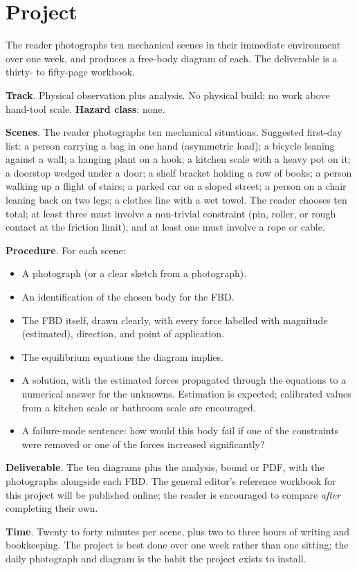 \section{Project}

\begin{project}
The reader photographs ten mechanical scenes in their immediate
environment over one week, and produces a free-body diagram of each.
The deliverable is a thirty- to fifty-page workbook.

\textbf{Track}. Physical observation plus analysis. No physical
build; no work above hand-tool scale. \textbf{Hazard class}: none.

\textbf{Scenes}. The reader photographs ten mechanical situations.
Suggested first-day list: a person carrying a bag in one hand
(asymmetric load); a bicycle leaning against a wall; a hanging
plant on a hook; a kitchen scale with a heavy pot on it; a doorstop
wedged under a door; a shelf bracket holding a row of books; a
person walking up a flight of stairs; a parked car on a sloped
street; a person on a chair leaning back on two legs; a clothes line
with a wet towel. The reader chooses ten total; at least three must
involve a non-trivial constraint (pin, roller, or rough contact at
the friction limit), and at least one must involve a rope or cable.

\textbf{Procedure}. For each scene:

\begin{itemize}[leftmargin=*]
  \item A photograph (or a clear sketch from a photograph).
  \item An identification of the chosen body for the FBD.
  \item The FBD itself, drawn clearly, with every force labelled with
    magnitude (estimated), direction, and point of application.
  \item The equilibrium equations the diagram implies.
  \item A solution, with the estimated forces propagated through the
    equations to a numerical answer for the unknowns. Estimation is
    expected; calibrated values from a kitchen scale or bathroom
    scale are encouraged.
  \item A failure-mode sentence: how would this body fail if one of
    the constraints were removed or one of the forces increased
    significantly?
\end{itemize}

\textbf{Deliverable}. The ten diagrams plus the analysis, bound or
PDF, with the photographs alongside each FBD. The general editor's
reference workbook for this project will be published online; the
reader is encouraged to compare \emph{after} completing their own.

\textbf{Time}. Twenty to forty minutes per scene, plus two to three
hours of writing and bookkeeping. The project is best done over one
week rather than one sitting; the daily photograph and diagram is
the habit the project exists to install.
\end{project}

